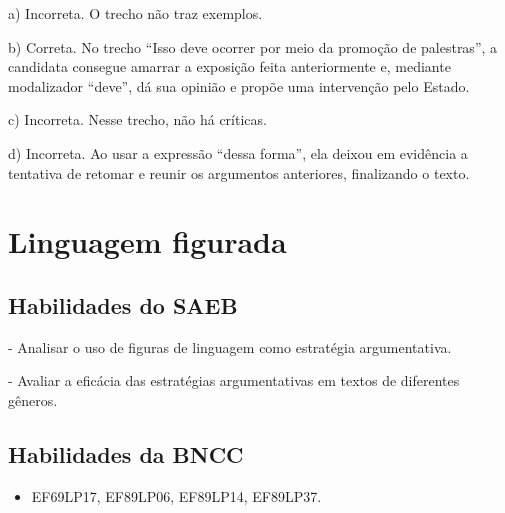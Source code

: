 \begin{itemize}
\begin{itemize}
{\begin{itemize}
\begin{itemize}
a) Incorreta. O trecho não traz exemplos.

b) Correta. No trecho ``Isso deve ocorrer por meio da promoção de
palestras'', a candidata consegue amarrar a exposição feita
anteriormente e, mediante modalizador ``deve'', dá sua opinião e propõe
uma intervenção pelo Estado.

c) Incorreta. Nesse trecho, não há críticas.

d) Incorreta. Ao usar a expressão ``dessa forma'', ela deixou em
evidência a tentativa de retomar e reunir os argumentos anteriores,
finalizando o texto.

\chapter{Linguagem figurada}

\section{Habilidades do SAEB}

- Analisar o uso de figuras de linguagem como estratégia argumentativa.

- Avaliar a eficácia das estratégias argumentativas em textos de
diferentes gêneros.

\section{Habilidades da BNCC}

\begin{itemize}
\item EF69LP17, EF89LP06, EF89LP14, EF89LP37.
\end{itemize}

\end{itemize}
\end{itemize}}
\end{itemize}
\end{itemize}
